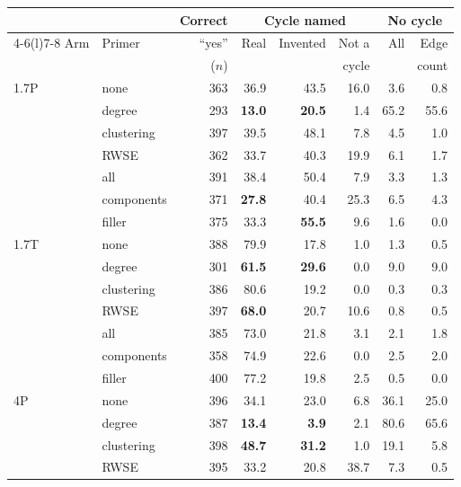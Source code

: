 \begin{table}[!t]
\centering\footnotesize
\setlength{\tabcolsep}{1.6pt}
\begin{tabular}{llrrrrrr}
\toprule
 & & Correct & \multicolumn{3}{c}{Cycle named} & \multicolumn{2}{c}{No cycle}\\
\cmidrule(lr){4-6}\cmidrule(l){7-8}
Arm & Primer & ``yes'' & Real & Invented & Not a & All & Edge\\
 & & ($n$) & & & cycle & & count\\
\midrule
1.7P & none & 363 & 36.9 & 43.5 & 16.0 & 3.6 & 0.8\\ %
 & degree & 293 & \textbf{13.0} & \textbf{20.5} & 1.4 & 65.2 & 55.6\\ %
 & clustering & 397 & 39.5 & 48.1 & 7.8 & 4.5 & 1.0\\ %
 & RWSE & 362 & 33.7 & 40.3 & 19.9 & 6.1 & 1.7\\ %
 & all & 391 & 38.4 & 50.4 & 7.9 & 3.3 & 1.3\\ %
 & components & 371 & \textbf{27.8} & 40.4 & 25.3 & 6.5 & 4.3\\ %
 & filler & 375 & 33.3 & \textbf{55.5} & 9.6 & 1.6 & 0.0\\ %
\addlinespace[2pt]
1.7T & none & 388 & 79.9 & 17.8 & 1.0 & 1.3 & 0.5\\ %
 & degree & 301 & \textbf{61.5} & \textbf{29.6} & 0.0 & 9.0 & 9.0\\ %
 & clustering & 386 & 80.6 & 19.2 & 0.0 & 0.3 & 0.3\\ %
 & RWSE & 397 & \textbf{68.0} & 20.7 & 10.6 & 0.8 & 0.5\\ %
 & all & 385 & 73.0 & 21.8 & 3.1 & 2.1 & 1.8\\ %
 & components & 358 & 74.9 & 22.6 & 0.0 & 2.5 & 2.0\\ %
 & filler & 400 & 77.2 & 19.8 & 2.5 & 0.5 & 0.0\\ %
\addlinespace[2pt]
4P & none & 396 & 34.1 & 23.0 & 6.8 & 36.1 & 25.0\\ %
 & degree & 387 & \textbf{13.4} & \textbf{3.9} & 2.1 & 80.6 & 65.6\\ %
 & clustering & 398 & \textbf{48.7} & \textbf{31.2} & 1.0 & 19.1 & 5.8\\ %
 & RWSE & 395 & 33.2 & 20.8 & 38.7 & 7.3 & 0.5\\ %

\end{tabular}
\end{table}
